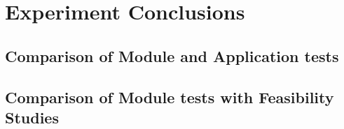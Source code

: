 \section{Experiment Conclusions}
\label{section:experiment conclusions}


\subsection{Comparison of Module and Application tests}
\subsection{Comparison of Module tests with Feasibility Studies}